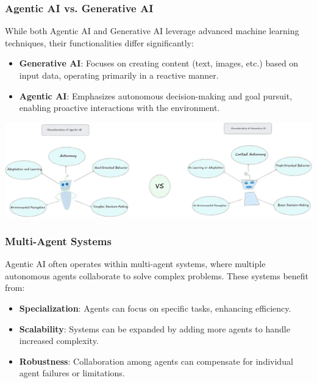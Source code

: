 \subsubsection{Agentic AI vs. Generative AI}
While both Agentic AI and Generative AI leverage advanced machine learning techniques, their functionalities differ significantly:

\begin{itemize}
    \item \textbf{Generative AI}: Focuses on creating content (text, images, etc.) based on input data, operating primarily in a reactive manner.
    \item \textbf{Agentic AI}: Emphasizes autonomous decision-making and goal pursuit, enabling proactive interactions with the environment.
\end{itemize}

\begin{center}
    \centering
    \includegraphics[width=1\textwidth]{Images/agentic_vs_generative_ai.png}
     \cite{agentic_vs_generative_ai}
    \label{fig:agentic_vs_generative_ai}
\end{center}

\subsubsection{Multi-Agent Systems}
Agentic AI often operates within multi-agent systems, where multiple autonomous agents collaborate to solve complex problems. These systems benefit from:

\begin{itemize}
    \item \textbf{Specialization}: Agents can focus on specific tasks, enhancing efficiency.
    \item \textbf{Scalability}: Systems can be expanded by adding more agents to handle increased complexity.
    \item \textbf{Robustness}: Collaboration among agents can compensate for individual agent failures or limitations.
\end{itemize}

